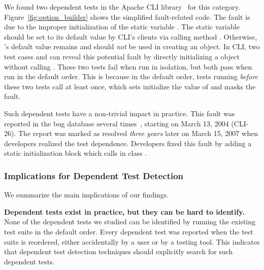 We found two dependent tests in
the Apache CLI library~\cite{cli} for this category.
Figure~\ref{fig:option_builder} shows the simplified fault-related
code. The fault is due to the improper initialization of the static variable
. The static variable  should be set
to its default value  by CLI's clients via calling
method . Otherwise, 's
default value remains  and should \emph{not} be
used in creating an  object.
In CLI, two test cases 
 and 
can reveal this potential fault by directly initializing
a  object without calling .
These two tests fail when run in isolation,
but both pass when run in the default order. This is because
in the default order, tests running \emph{before} these
two tests call  at least once, which sets
initialize the value of  and masks the fault.


Such dependent tests have a non-trivial impact in practice.
This fault was reported in the bug database several times~\cite{clibug},
starting on March 13, 2004 (CLI-26). The report was marked as resolved
\emph{three years} later on March 15, 2007 when developers
realized the test dependence. Developers fixed this
fault by adding a static initialization block which
calls  in class .



\subsubsection{Implications for Dependent Test Detection}

We summarize the main implications of our findings.

\noindent \textbf{{Dependent tests exist in practice, but
they can be hard to identify.}}
None of the dependent tests we studied can be identified by
running the existing test suite in the default order. 
Every dependent test was reported when the
test suite is reordered, either accidentally by a user or
by a testing tool. This indicates that
dependent test detection techniques should
explicitly search for such dependent tests.

